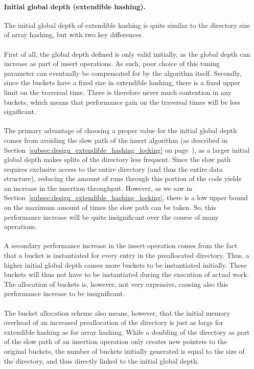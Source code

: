 \documentclass[11pt]{report} %
\begin{document}
\paragraph{Initial global depth (extendible hashing).} The initial global depth of extendible hashing is quite similar to the directory size of array hashing, but with two key differences. \\
\\
First of all, the global depth defined is only valid initially, as the global depth can increase as part of insert operations. As such, poor choice of this tuning parameter can eventually be compensated for by the algorithm itself. Secondly, since the buckets have a fixed size in extendible hashing, there is a fixed upper limit on the traversal time. There is therefore never much contention in any buckets, which means that performance gain on the traversal times will be less significant.\\
\\
The primary advantage of choosing a proper value for the initial global depth comes from avoiding the slow path of the insert algorithm (as described in Section~\ref{subsec:design_extendible_hashing_locking} on page~\pageref{subsec:design_extendible_hashing_locking}), as a larger initial global depth makes splits of the directory less frequent. Since the slow path requires exclusive access to the entire directory (and thus the entire data structure), reducing the amount of runs through this portion of the code yields an increase in the insertion throughput. However, as we saw in Section~\ref{subsec:design_extendible_hashing_locking}, there is a low upper bound on the maximum amount of times the slow path can be taken. So, this performance increase will be quite insignificant over the course of many operations.\\
\\
A secondary performance increase in the insert operation comes from the fact that a bucket is instantiated for every entry in the preallocated directory. Thus, a higher initial global depth causes more buckets to be instantiated initially. These buckets will thus not have to be instantiated during the execution of actual work. The allocation of buckets is, however, not very expensive, causing also this performance increase to be insignificant. \\
\\
The bucket allocation scheme also means, however, that the initial memory overhead of an increased preallocation of the directory is just as large for extendible hashing as for array hashing. While a doubling of the directory as part of the slow path of an insertion operation only creates new pointers to the original buckets, the number of buckets initially generated is equal to the size of the directory, and thus directly linked to the initial global depth. \\
\end{document}
